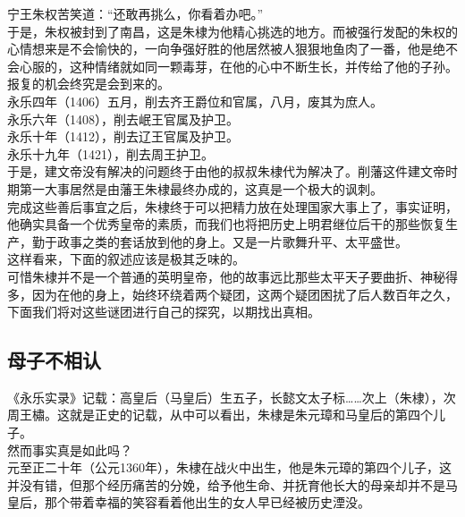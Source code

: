 \begin{multicols}{\theparacolNo}
宁王朱权苦笑道：“还敢再挑么，你看着办吧。”\\

于是，朱权被封到了南昌，这是朱棣为他精心挑选的地方。而被强行发配的朱权的心情想来是不会愉快的，一向争强好胜的他居然被人狠狠地鱼肉了一番，他是绝不会心服的，这种情绪就如同一颗毒芽，在他的心中不断生长，并传给了他的子孙。\\

报复的机会终究是会到来的。\\

永乐四年（1406）五月，削去齐王爵位和官属，八月，废其为庶人。\\

永乐六年（1408），削去岷王官属及护卫。\\

永乐十年（1412），削去辽王官属及护卫。\\

永乐十九年（1421），削去周王护卫。\\

于是，建文帝没有解决的问题终于由他的叔叔朱棣代为解决了。削藩这件建文帝时期第一大事居然是由藩王朱棣最终办成的，这真是一个极大的讽刺。\\

完成这些善后事宜之后，朱棣终于可以把精力放在处理国家大事上了，事实证明，他确实具备一个优秀皇帝的素质，而我们也将把历史上明君继位后干的那些恢复生产，勤于政事之类的套话放到他的身上。又是一片歌舞升平、太平盛世。\\

这样看来，下面的叙述应该是极其乏味的。\\

可惜朱棣并不是一个普通的英明皇帝，他的故事远比那些太平天子要曲折、神秘得多，因为在他的身上，始终环绕着两个疑团，这两个疑团困扰了后人数百年之久，下面我们将对这些谜团进行自己的探究，以期找出真相。\\

\subsection{母子不相认}
《永乐实录》记载：高皇后（马皇后）生五子，长懿文太子标……次上（朱棣），次周王橚。这就是正史的记载，从中可以看出，朱棣是朱元璋和马皇后的第四个儿子。\\

然而事实真是如此吗？\\

元至正二十年（公元1360年），朱棣在战火中出生，他是朱元璋的第四个儿子，这并没有错，但那个经历痛苦的分娩，给予他生命、并抚育他长大的母亲却并不是马皇后，那个带着幸福的笑容看着他出生的女人早已经被历史湮没。\\


\end{multicols}
